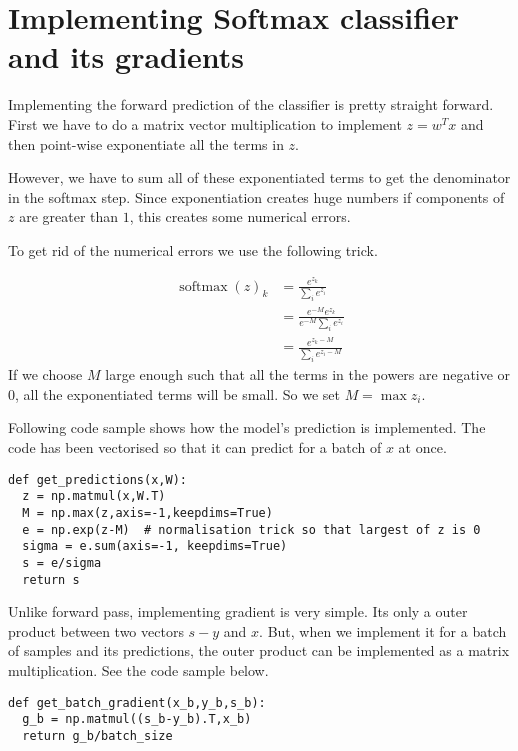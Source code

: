 \documentclass[10pt]{article}
\begin{document}
\section{Implementing Softmax classifier and its gradients}
Implementing the forward prediction of the classifier is pretty straight forward. First we have to do a matrix vector multiplication to implement $z=w^Tx$ and then point-wise exponentiate all the terms in $z$.

However, we have to sum all of these exponentiated terms to get the denominator in the softmax step. Since exponentiation creates huge numbers if components of $z$ are greater than $1$, this creates some numerical errors. 
\begin{figure}[h]\centering
{}
\end{figure}

To get rid of the numerical errors we use the following trick.

\begin{align*}
\operatorname{softmax}(z)_k &= \frac{e^{z_k}}{\sum_i e^{z_i}}
\\
&= \frac{e^{-M}e^{z_k}}{e^{-M}\sum_i e^{z_i}}
\\
&= \frac{e^{z_k-M}}{\sum_i e^{z_i-M}}
\end{align*}
If we choose $M$ large enough such that all the terms in the powers are negative or $0$, all the 
exponentiated terms will be small. So we set $M = \max z_i$.

Following code sample shows how the model's prediction is implemented. The code has been vectorised so that it can predict for a batch of $x$ at once. 

\begin{verbatim}
def get_predictions(x,W):
  z = np.matmul(x,W.T)
  M = np.max(z,axis=-1,keepdims=True)
  e = np.exp(z-M)  # normalisation trick so that largest of z is 0
  sigma = e.sum(axis=-1, keepdims=True)
  s = e/sigma
  return s

\end{verbatim}

Unlike forward pass, implementing gradient is very simple. Its only a outer product between two vectors $s-y$ and $x$. But, when we implement it for a batch of samples and its predictions, the outer product can be implemented as a matrix multiplication. See the code sample below. 
\begin{verbatim}
def get_batch_gradient(x_b,y_b,s_b):
  g_b = np.matmul((s_b-y_b).T,x_b)
  return g_b/batch_size
\end{verbatim}
%
%
\end{document}
